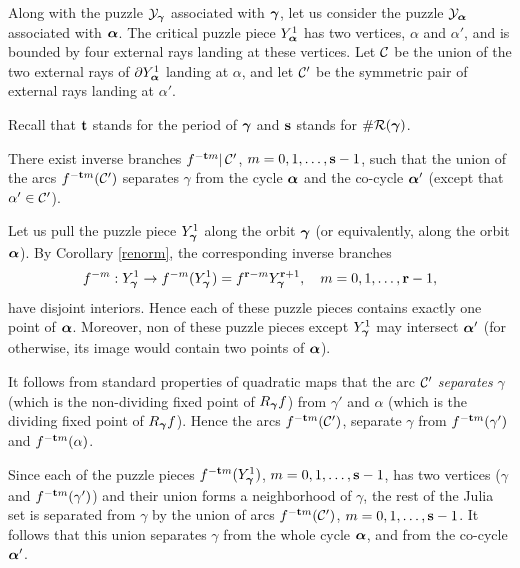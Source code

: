 
Along with the puzzle ${\mathcal Y}_{\mbox{\scriptsize\boldmath$\gamma$} }$ associated with ${\mbox{\boldmath$\gamma$} }$, let us consider the puzzle ${\mathcal Y}_{\mbox{\scriptsize\boldmath$\alpha$} }$
associated with ${\mbox{\boldmath$\alpha$} }$. 
The critical puzzle piece $Y_{\mbox{\scriptsize\boldmath$\alpha$} }^1$ has two vertices, $\alpha$ and $\alpha'$,
and is bounded by four external rays landing at these vertices. Let ${\mathcal C}$ 
be the union of the two external rays of $\partial Y^1_{\mbox{\scriptsize\boldmath$\alpha$} }$ landing at $\alpha$, 
and let ${\mathcal C}'$  be the symmetric pair of external rays landing at $\alpha'$. 
     
Recall that ${\mathbf{t}}$ stands for the period of ${\mbox{\boldmath$\gamma$} }$ and ${\mathbf{s}}$ stands for $\# {\mathcal R}({\mbox{\boldmath$\gamma$} })$. 

\begin{lem}\label{separation}
  There exist inverse branches $f^{-{\mathbf{t}} m} |\, {\mathcal C}'$, $m=0,1,\dots, {\mathbf{s}}-1$, 
such that the union of the arcs $f^{-{\mathbf{t}} m} ({\mathcal C}')$  separates $\gamma$ from 
the cycle ${\mbox{\boldmath$\alpha$} }$ and the co-cycle ${\mbox{\boldmath$\alpha$} }'$
(except that $\alpha'\in {\mathcal C}'$). 
\end{lem}

\begin{pf}
Let us pull the puzzle piece $Y_{\mbox{\scriptsize\boldmath$\gamma$} }^1$ along the orbit ${\mbox{\boldmath$\gamma$} }$ 
(or equivalently, along the orbit  ${\mbox{\boldmath$\alpha$} }$). 
By Corollary \ref{renorm}, 
the corresponding  inverse branches 
$$
   f^{-m} : Y^1_{\mbox{\scriptsize\boldmath$\gamma$} } \rightarrow f^{-m}(Y^1_{\mbox{\scriptsize\boldmath$\gamma$} }) = f^{{\mathbf{r}}-m} Y^{{\mathbf{r}}+1}_{\mbox{\scriptsize\boldmath$\gamma$} },\quad  m=0,1,\dots, {\mathbf{r}}-1,
$$ 
have disjoint interiors.  
Hence each of these puzzle pieces contains exactly one point of ${\mbox{\boldmath$\alpha$} }$. 
Moreover, non of these puzzle pieces except $Y^1_{\mbox{\scriptsize\boldmath$\gamma$} }$ may intersect ${\mbox{\boldmath$\alpha$} }'$
(for otherwise, its image would contain two points of ${\mbox{\boldmath$\alpha$} }$).   

It follows from standard properties of quadratic maps 
that the arc ${\mathcal C}'$ {\it separates} 
$\gamma$ (which is the non-dividing fixed point of $R_{\mbox{\scriptsize\boldmath$\gamma$} } f$) from $\gamma'$ and
$\alpha$ (which is the dividing fixed point of $R_{\mbox{\scriptsize\boldmath$\gamma$} } f$). 
Hence the arcs $f^{-{\mathbf{t}} m} ({\mathcal C}')$, 
separate $\gamma$ from  $f^{-{\mathbf{t}} m}(\gamma')$ and $f^{-{\mathbf{t}} m}(\alpha)$. 

Since each of the puzzle pieces $f^{-{\mathbf{t}} m} ( Y^1_{\mbox{\scriptsize\boldmath$\gamma$} })$,  $m=0,1,\dots, {\mathbf{s}}-1$, has two vertices
($\gamma$ and $f^{-{\mathbf{t}} m}(\gamma')$) and  their union forms a neighborhood of $\gamma$,
the rest of the Julia set is separated from $\gamma$ by the union of arcs
$f^{-{\mathbf{t}} m}({\mathcal C}')$, $m=0,1,\dots, {\mathbf{s}}-1$. 
It follows that this union separates $\gamma$ from the whole cycle ${\mbox{\boldmath$\alpha$} }$, 
and from the co-cycle ${\mbox{\boldmath$\alpha$} }'$. 
\end{pf}

